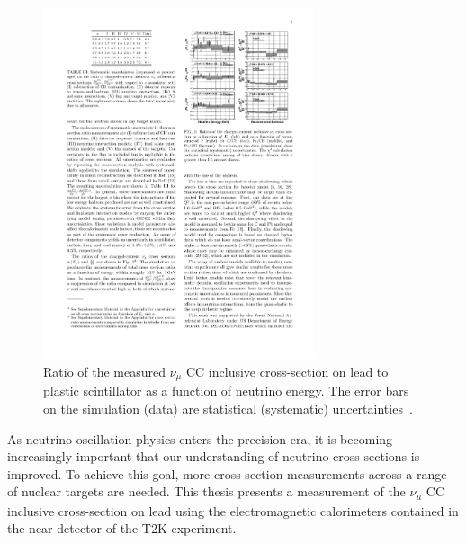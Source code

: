 \begin{figure}%
  \centering
  \includegraphics[width=8cm]{images/neutrino_interactions/MINERvA_XSec.pdf}
  \caption{Ratio of the measured $\nu_\mu$ CC inclusive cross-section on lead to plastic scintillator as a function of neutrino energy.  The error bars on the simulation (data) are statistical (systematic) uncertainties~\cite{PhysRevLett.112.231801}.}
  \label{fig:MINERvAXSec}
\end{figure}
\newline
\newline
As neutrino oscillation physics enters the precision era, it is becoming increasingly important that our understanding of neutrino cross-sections is improved.  To achieve this goal, more cross-section measurements across a range of nuclear targets are needed.  This thesis presents a measurement of the $\nu_\mu$ CC inclusive cross-section on lead using the electromagnetic calorimeters contained in the near detector of the T2K experiment.  









